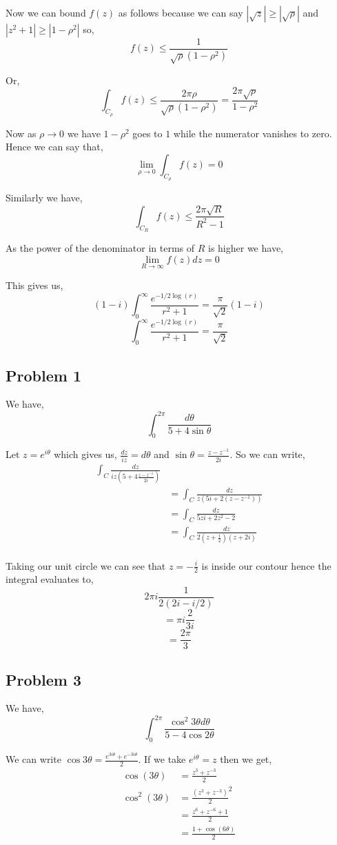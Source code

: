 \documentclass[a4paper]{report}
\begin{document}
Now we can bound $f(z)$ as follows because we can say $|\sqrt{z} | \ge | \sqrt{\rho}|$ and  $|z^2 + 1| \ge |1 - \rho^2|$ so, 
$$ f(z) \le \frac{1}{\sqrt{\rho} (1 - \rho^2)} $$ 

Or, 
$$ \int_{C_\rho} f(z)\le \frac{2\pi \rho}{\sqrt{\rho} (1 - \rho^2)} = \frac{2\pi \sqrt{\rho}}{1 - \rho^2} $$ 

Now as $\rho \rightarrow 0$ we have $1 - \rho^2$ goes to $1$ while the numerator vanishes to zero. Hence we can say that, 
$$ \lim_{\rho \to 0} \int_{C_\rho} f(z) = 0 $$ 

Similarly we have, 
$$ \int_{C_R} f(z) \le \frac{2 \pi \sqrt{R}}{R^2 - 1} $$ 

As the power of the denominator in terms of $R$ is higher we have, 
$$ \lim_{R \to \infty} f(z) dz = 0 $$ 

This gives us, 
$$ (1 - i)\int_{0}^{\infty} \frac{e^{-1 / 2\log(r)}}{r^2 + 1} = \frac{\pi}{\sqrt{2}}(1 - i) $$
$$ \int_{0}^{\infty} \frac{e^{-1 / 2\log(r)}}{r^2 + 1} = \frac{\pi}{\sqrt{2}} $$



\subsection{Problem 1}
We have, 
$$ \int_0^{2\pi} \frac{d\theta}{5 + 4 \sin \theta} $$ 

Let $z = e^{i\theta}$ which gives  us, $\frac{dz}{iz} = d\theta$ and $\sin \theta = \frac{z - z^{-1}}{2i}$. So we can write, 
\begin{align*}
\int_C \frac{dz}{iz (5 + 4\frac{z - z^{-1}}{2i})}\\
&= \int_C \frac{dz}{z (5i + 2 (z - z^{-1}))}\\
&= \int_C \frac{dz}{5zi + 2 z^2 - 2}\\
&= \int_C \frac{dz}{2(z + \frac{i}{2}) (z + 2i)}\\
\end{align*}

Taking our unit circle we can see that $z = -\frac{i}{2}$ is inside our contour hence the integral evaluates to, 
$$ 2\pi i \frac{1}{2 (2i - i / 2)} $$ 
$$ = \pi i \frac{2}{3i} $$ 
$$ = \frac{2\pi}{3}$$


\subsection*{Problem 3}
We have, 
$$ \int_0^{2\pi} \frac{\cos^2 3\theta d\theta}{5 - 4\cos 2\theta} $$ 


We can write $\cos 3\theta = \frac{e^{3i\theta} + e^{-3i\theta}}{2}$. If we take $e^{i\theta} = z$ then we get, 
\begin{align*}
    \cos(3\theta) &= \frac{z^{3} + z^{-3}}{2}\\
    \cos^2(3\theta) &= \frac{(z^{3} + z^{-3})}{2}^2\\
                    &= \frac{z^{6} + z^{-6} + 1 }{2}\\
                    &= \frac{1 + \cos(6\theta)}{2}
\end{align*}
\end{document}
